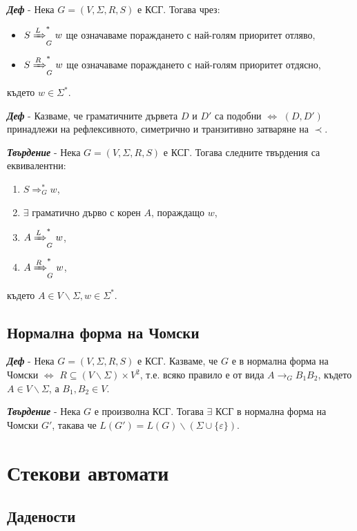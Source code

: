 \documentclass[fleqn,12pt]{article}
\begin{document}
\begin{flushleft}
\textit{\textbf{Деф}} - Нека $G = (V, \Sigma, R, S)$ е КСГ. Тогава чрез:
\begin{itemize}
    \item $S \xRightarrow[]{L}_G^* w$ ще означаваме пораждането с най-голям приоритет отляво,
    \item $S \xRightarrow[]{R}_G^* w$ ще означаваме пораждането с най-голям приоритет отдясно,
\end{itemize} 
където $w \in \Sigma^*$.

\textit{\textbf{Деф}} - Казваме, че граматичните дървета $D$ и $D'$ са подобни $\iff$ $(D, D')$ принадлежи на рефлексивното, симетрично и транзитивно затваряне на $\prec$.

\textit{\textbf{Твърдение}} - Нека $G = (V, \Sigma, R, S)$ е КСГ. Тогава следните твърдения са еквивалентни:
\begin{enumerate}
    \item $S \Rightarrow_G^* w$,
    \item $\exists$ граматично дърво с корен $A$, пораждащо $w$,
    \item $A \xRightarrow[]{L}_G^* w$,
    \item $A \xRightarrow[]{R}_G^* w$,
\end{enumerate}
където $A \in V \backslash \Sigma, w \in \Sigma^*$.

\subsection{Нормална форма на Чомски}

\textit{\textbf{Деф}} - Нека $G = (V, \Sigma, R, S)$ е КСГ. Казваме, че $G$ е в нормална форма на Чомски $\iff$ $R \subseteq (V \backslash \Sigma) \times V^2$, т.е. всяко правило е от вида $A \to_G B_1B_2$, където $A \in V \backslash \Sigma$, а $B_1, B_2 \in V$.

\textit{\textbf{Твърдение}} - Нека $G$ е произволна КСГ. Тогава $\exists$ КСГ в нормална форма на Чомски $G'$, такава че $L(G') = L(G) \backslash (\Sigma \cup \{\varepsilon\})$.

\section{Стекови автомати}

\subsection{Дадености}


\end{flushleft}
\end{document}
